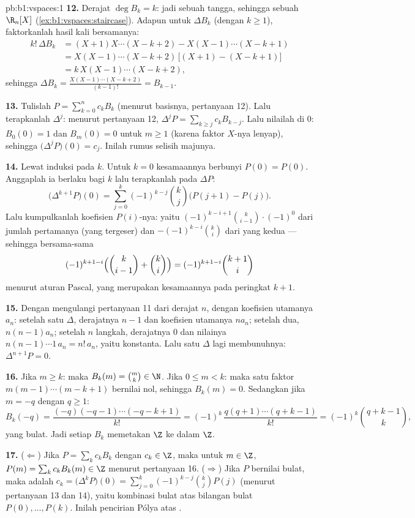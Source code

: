 \begin{solution}{pb:b1:vspaces:1}
\textbf{12.} Derajat $\deg B_k = k$: jadi sebuah tangga, sehingga sebuah 
$\R_n[X]$ (\cref{ex:b1:vspaces:staircase}). Adapun untuk $\Delta B_k$
(dengan $k \geq 1$), faktorkanlah hasil kali bersamanya:
\begin{align*}
k!\,\Delta B_k
&= (X+1)X\cdots(X-k+2) - X(X-1)\cdots(X-k+1) \\
&= X(X-1)\cdots(X-k+2)\,\bigl[(X+1) - (X-k+1)\bigr] \\
&= k\,X(X-1)\cdots(X-k+2),
\end{align*}
sehingga $\Delta B_k = \frac{X(X-1)\cdots(X-k+2)}{(k-1)!} = B_{k-1}$.

\textbf{13.} Tulislah $P = \sum_{k=0}^{n} c_k B_k$ (menurut basisnya, pertanyaan
12). Lalu terapkanlah $\Delta^{j}$: menurut pertanyaan 12, $\Delta^{j} P = \sum_{k
\geq j} c_k B_{k-j}$. Lalu nilailah di $0$: $B_0(0) = 1$ dan $B_m(0) =
0$ untuk $m \geq 1$ (karena faktor $X$-nya lenyap), sehingga
$\bigl(\Delta^{j}P\bigr)(0) = c_j$. Inilah rumus selisih
majunya.

\textbf{14.} Lewat induksi pada $k$. Untuk $k = 0$ kesamaannya berbunyi
$P(0) = P(0)$. Anggaplah ia berlaku bagi $k$ lalu terapkanlah pada $\Delta P$:
\[
\bigl(\Delta^{k+1} P\bigr)(0)
= \sum_{j=0}^{k} (-1)^{k-j}\binom kj \bigl(P(j+1) - P(j)\bigr).
\]
Lalu kumpulkanlah koefisien $P(i)$-nya: yaitu $(-1)^{k-i+1}\binom
k{i-1}\cdot(-1)^{0}$ dari jumlah pertamanya (yang tergeser) dan
$-(-1)^{k-i}\binom ki$ dari yang kedua --- sehingga bersama-sama
\[
(-1)^{k+1-i}\Bigl(\binom k{i-1} + \binom ki\Bigr)
= (-1)^{k+1-i}\binom{k+1}i
\]
menurut aturan Pascal, yang merupakan kesamaannya pada peringkat $k + 1$.

\textbf{15.} Dengan mengulangi pertanyaan 11 dari derajat $n$, dengan koefisien
utamanya $a_n$: setelah satu $\Delta$, derajatnya $n-1$ dan koefisien
utamanya $n a_n$; setelah dua, $n(n-1)a_n$; setelah $n$ langkah,
derajatnya $0$ dan nilainya $n(n-1)\cdots 1\, a_n = n!\,a_n$, yaitu konstanta.
Lalu satu $\Delta$ lagi membunuhnya: $\Delta^{n+1}P = 0$.

\textbf{16.} Jika $m \geq k$: maka $B_k(m) = \binom mk \in \N$. Jika $0
\leq m < k$: maka satu faktor $m(m-1)\cdots(m-k+1)$ bernilai nol, sehingga
$B_k(m) = 0$. Sedangkan jika $m = -q$ dengan $q \geq 1$:
\[
B_k(-q) = \frac{(-q)(-q-1)\cdots(-q-k+1)}{k!}
= (-1)^k\,\frac{q(q+1)\cdots(q+k-1)}{k!}
= (-1)^k \binom{q+k-1}{k},
\]
yang bulat. Jadi setiap $B_k$ memetakan $\Z$ ke dalam $\Z$.

\textbf{17.} ($\Leftarrow$) Jika $P = \sum_k c_k B_k$ dengan $c_k \in
\Z$, maka untuk $m \in \Z$, $P(m) = \sum_k c_k B_k(m) \in \Z$ menurut
pertanyaan 16. ($\Rightarrow$) Jika $P$ bernilai bulat, maka
 adalah $c_k = \bigl(\Delta^k P\bigr)(0) = \sum_{j=0}^k
(-1)^{k-j}\binom kj P(j)$ (menurut pertanyaan 13 dan 14), yaitu kombinasi
bulat atas bilangan bulat $P(0), \dots, P(k)$. Inilah
pencirian Pólya atas .


\end{solution}

